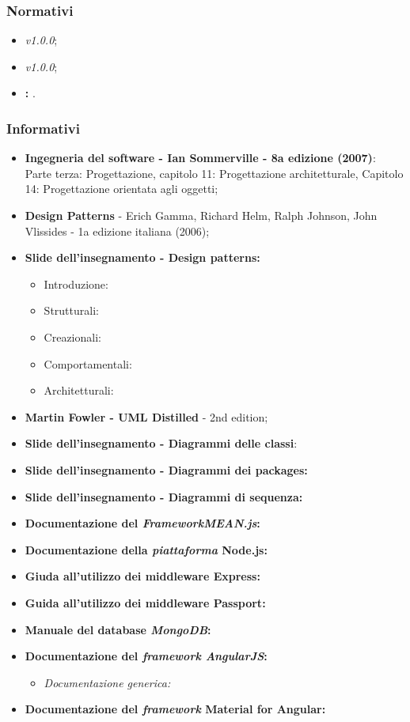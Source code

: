 \subsubsection{Normativi}
\begin{itemize}
	\item \textit{\NdP v1.0.0};
	\item \textit{\AdR v1.0.0};
	\item \textbf{\VE: }.
\end{itemize}
\subsubsection{Informativi}
\begin{itemize}
	\item \textbf{Ingegneria del software - Ian Sommerville - 8a edizione (2007)}: \\
	Parte terza: Progettazione, capitolo 11: Progettazione architetturale, Capitolo 14: Progettazione orientata agli oggetti;
	\item \textbf{Design Patterns} - Erich Gamma, Richard Helm, Ralph Johnson, John Vlissides - 1a edizione italiana (2006);
	\item \textbf{Slide dell'insegnamento - Design patterns:}
	\begin{itemize}
		\item Introduzione:
		\item Strutturali:
		\item Creazionali:
		\item Comportamentali:
		\item Architetturali:
	\end{itemize}
	\item \textbf{Martin Fowler - UML Distilled} - 2nd edition;
	\item \textbf{Slide dell'insegnamento - Diagrammi delle classi}:
	\item \textbf{Slide dell'insegnamento - Diagrammi dei packages:}
	\item \textbf{Slide dell'insegnamento - Diagrammi di sequenza:}
	\item \textbf{Documentazione del \textit{FrameworkMEAN.js}:}
	\item \textbf{Documentazione della \textit{piattaforma} Node.js:}
	\item \textbf{Giuda all'utilizzo dei middleware Express:}
	\item \textbf{Guida all'utilizzo dei middleware Passport:}
	\item \textbf{Manuale del database \textit{MongoDB}:}
	\item \textbf{Documentazione del \textit{framework AngularJS}:}
	\begin{itemize}
		\item \textit{Documentazione generica:}
	\end{itemize}
	\item \textbf{Documentazione del \textit{framework} Material for Angular:}
\end{itemize}